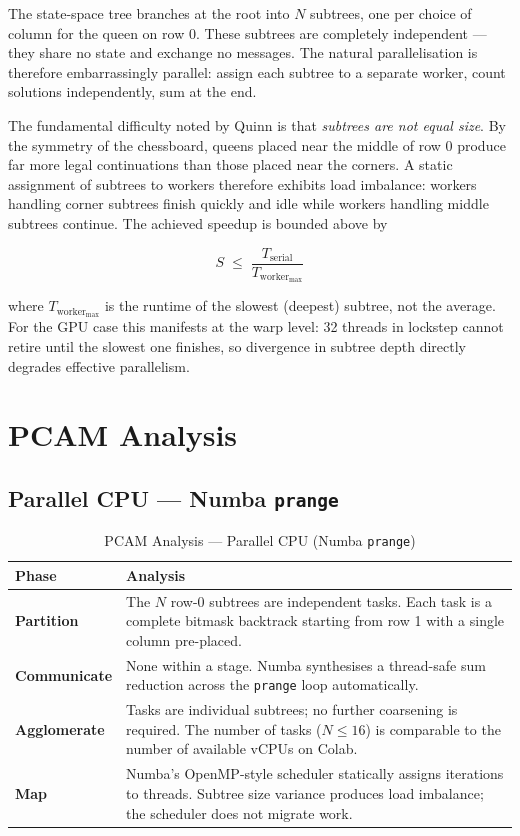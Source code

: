 \documentclass[12pt, letterpaper]{article}
\begin{document}
The state-space tree branches at the root into $N$ subtrees, one per choice of column for the queen on row 0. These subtrees are completely independent --- they share no state and exchange no messages. The natural parallelisation is therefore embarrassingly parallel: assign each subtree to a separate worker, count solutions independently, sum at the end.

The fundamental difficulty noted by Quinn is that \emph{subtrees are not equal size}. By the symmetry of the chessboard, queens placed near the middle of row 0 produce far more legal continuations than those placed near the corners. A static assignment of subtrees to workers therefore exhibits load imbalance: workers handling corner subtrees finish quickly and idle while workers handling middle subtrees continue. The achieved speedup is bounded above by

\begin{equation}
    S \;\leq\; \frac{T_{\text{serial}}}{T_{\text{worker}_{\max}}}
\end{equation}

where $T_{\text{worker}_{\max}}$ is the runtime of the slowest (deepest) subtree, not the average. For the GPU case this manifests at the warp level: 32 threads in lockstep cannot retire until the slowest one finishes, so divergence in subtree depth directly degrades effective parallelism.

\section{PCAM Analysis}
\label{sec:pcam}

\subsection{Parallel CPU --- Numba \texttt{prange}}

\begin{table}[H]
\centering
\caption{PCAM Analysis --- Parallel CPU (Numba \texttt{prange})}
\begin{tabular}{@{}p{3cm}p{10cm}@{}}
\toprule
\textbf{Phase} & \textbf{Analysis} \\
\midrule
\textbf{Partition} & The $N$ row-0 subtrees are independent tasks. Each task is a complete bitmask backtrack starting from row 1 with a single column pre-placed. \\
\textbf{Communicate} & None within a stage. Numba synthesises a thread-safe sum reduction across the \texttt{prange} loop automatically. \\
\textbf{Agglomerate} & Tasks are individual subtrees; no further coarsening is required. The number of tasks ($N \leq 16$) is comparable to the number of available vCPUs on Colab. \\
\textbf{Map} & Numba's OpenMP-style scheduler statically assigns iterations to threads. Subtree size variance produces load imbalance; the scheduler does not migrate work. \\
\bottomrule
\end{tabular}
\label{tab:pcam_parallel_cpu}
\end{table}
\end{document}
